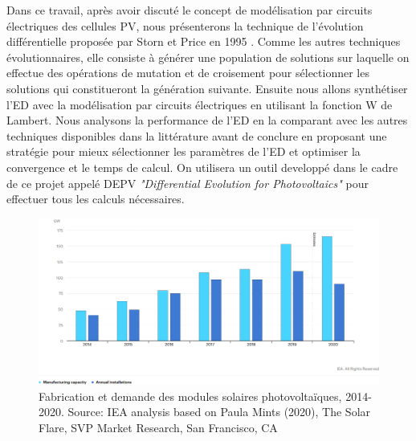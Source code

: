 Dans ce travail, après avoir discuté le concept de modélisation par circuits électriques des cellules PV, nous présenterons la technique de l'évolution différentielle proposée par Storn et Price en 1995 \cite{Storn1995}. Comme les autres techniques évolutionnaires, elle consiste à générer une population de solutions sur laquelle on effectue des opérations de mutation et de croisement pour sélectionner les solutions qui constitueront la génération suivante. Ensuite nous allons synthétiser l'ED avec la modélisation par circuits électriques en utilisant la fonction W de Lambert. Nous analysons la performance de l'ED en la comparant avec les autres techniques disponibles dans la littérature avant de conclure en proposant une stratégie pour mieux sélectionner les paramètres de l'ED et optimiser la convergence et le temps de calcul. On utilisera un outil developpé dans le cadre de ce projet appelé DEPV \textit{"Differential Evolution for Photovoltaics"} pour effectuer tous les calculs nécessaires.
\begin{figure}
  \begin{center}
    \includegraphics[width=\textwidth]{resources/ieapv.png}
    \caption{Fabrication et demande des modules solaires photovoltaïques, 2014-2020. Source: IEA analysis based on Paula Mints (2020), The Solar Flare, SVP Market Research, San Francisco, CA \cite{iea2020}}
    \label{fig:ieapv}
  \end{center}
\end{figure}
